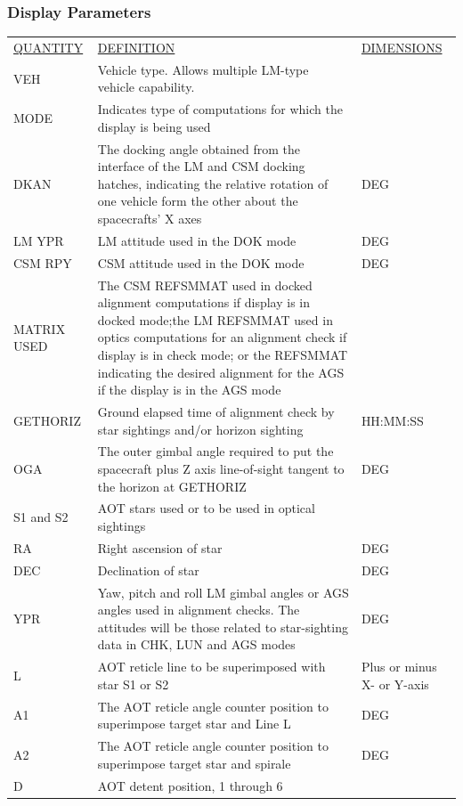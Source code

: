 \documentclass[11pt]{article} %
\begin{document}
\subsubsection{Display Parameters}

\begin{center}
\begin{tabular}{ L{2.4cm} L{7.1cm} L{3cm} }
\underline{QUANTITY} & \underline{DEFINITION} & \underline{DIMENSIONS} \\
VEH &Vehicle type. Allows multiple LM-type vehicle capability.&\\
MODE&Indicates type of computations for which the display is being used&\\
DKAN&The docking angle obtained from the interface of the LM and CSM docking hatches, indicating the relative rotation of one vehicle form the other about the spacecrafts' X axes&DEG\\
LM YPR&LM attitude used in the DOK mode&DEG\\
CSM RPY&CSM attitude used in the DOK mode&DEG\\
MATRIX USED&The CSM REFSMMAT used in docked alignment computations if display is in docked mode;the LM REFSMMAT used in optics computations for an alignment check if display is in check mode; or the REFSMMAT indicating the desired alignment for the AGS if the display is in the AGS mode&\\
GETHORIZ&Ground elapsed time of alignment check by star sightings and/or horizon sighting&HH:MM:SS\\
OGA&The outer gimbal angle required to put the spacecraft plus Z axis line-of-sight tangent to the horizon at GETHORIZ&DEG\\
S1 and S2&AOT stars used or to be used in optical sightings&\\
RA&Right ascension of star&DEG\\
DEC&Declination of star&DEG\\
YPR&Yaw, pitch and roll LM gimbal angles or AGS angles used in alignment checks. The attitudes will be those related to star-sighting data in CHK, LUN and AGS modes&DEG\\
L&AOT reticle line to be superimposed with star S1 or S2&Plus or minus X- or Y-axis\\
A1&The AOT reticle angle counter position to superimpose target star and Line L&DEG\\
A2&The AOT reticle angle counter position to superimpose target star and spirale&DEG\\
D&AOT detent position, 1 through 6&\\
\end{tabular}
\end{center}
\end{document}
